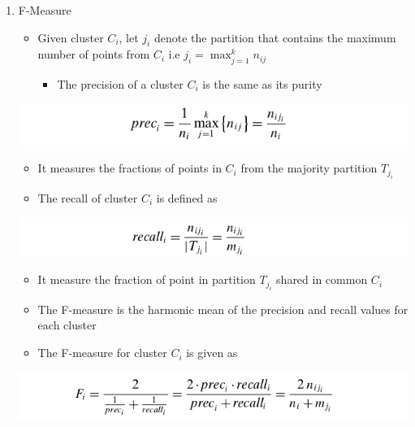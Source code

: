 \documentclass[11pt]{article}
\begin{document}
\begin{enumerate}
\item F-Measure
\label{sec:orgb8e63bc}
\begin{itemize}
\item Given cluster \(C_i\), let \(j_i\) denote the partition that contains the maximum number of points from \(C_i\) i.e \(j_i = \max_{j=1}^k{n_{ij}}\) 
\begin{itemize}
\item The precision of a cluster \(C_i\) is the same as its purity
\end{itemize}
\end{itemize}
\begin{center}
\includegraphics[width=.9\linewidth]{Clustering Validation/screenshot_2018-11-27_22-53-22.png}
\end{center}
\begin{itemize}
\item It measures the fractions of points in \(C_i\) from the majority partition \(T_{j_i}\)
\item The recall of cluster \(C_i\) is defined as
\end{itemize}
\begin{center}
\includegraphics[width=.9\linewidth]{Clustering Validation/screenshot_2018-11-27_22-54-25.png}
\end{center}
\begin{itemize}
\item It measure the fraction of point in partition \(T_{j_i}\) shared in common \(C_i\)
\item The F-measure is the harmonic mean of the precision and recall values for each cluster
\item The F-measure for cluster \(C_i\) is given as
\end{itemize}
\begin{center}
\includegraphics[width=.9\linewidth]{Clustering Validation/screenshot_2018-11-27_22-56-07.png}
\end{center}
\begin{itemize}

\end{itemize}
\end{enumerate}
\end{document}
